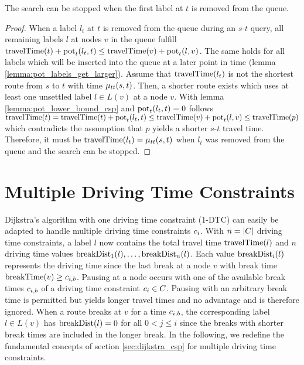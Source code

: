 \begin{theorem}\label{theorem:pot_stop_criterion}
	The search can be stopped when the first label at $t$ is removed from the queue.
\end{theorem}

\begin{proof}
	When a label $l_t$ at $t$ is removed from the queue during an $s$-$t$ query, all remaining labels $l$ at nodes $v$ in the queue fulfill $\operatorname{travelTime}(t) + \operatorname{pot}_t(l_t,t) \le \operatorname{travelTime}(v) + \operatorname{pot}_t(l,v)$. The same holds for all labels which will be inserted into the queue at a later point in time (lemma \ref{lemma:pot_labels_get_larger}). Assume that $\operatorname{travelTime}(l_t)$ is not the shortest route from $s$ to $t$ with time $\mu_{tt}(s,t)$. Then, a shorter route exists which uses at least one unsettled label $l \in L(v)$ at a node $v$. With lemma \ref{lemma:pot_lower_bound_csp} and $\operatorname{pot}_t(l_t,t) = 0$ follows $\operatorname{travelTime}(t) = \operatorname{travelTime}(t) + \operatorname{pot}_t(l_t,t) \le \operatorname{travelTime}(v) + \operatorname{pot}_t(l,v) \le \operatorname{travelTime}(p)$ which contradicts the assumption that $p$ yields a shorter $s$-$t$ travel time. Therefore, it must be $\operatorname{travelTime}(l_t) = \mu_{tt}(s,t)$ when $l_t$ was removed from the queue and the search can be stopped.
\end{proof}

\section{Multiple Driving Time Constraints}
Dijkstra's algorithm with one driving time constraint (1-DTC) can easily be adapted to handle multiple driving time constraints $c_i$. With $n=|C|$ driving time constraints, a label $l$ now contains the total travel time $\operatorname{travelTime}(l)$ and $n$ driving time values $\operatorname{breakDist}_1(l), \ldots , \operatorname{breakDist}_n(l)$. Each value $\operatorname{breakDist}_i(l)$ represents the driving time since the last break at a node $v$ with break time $\operatorname{breakTime}(v) \ge c_{i,b}$. Pausing at a node occurs with one of the available break times $c_{i,b}$ of a driving time constraint $c_i \in C$. Pausing with an arbitrary break time is permitted but yields longer travel times and no advantage and is therefore ignored. When a route breaks at $v$ for a time $c_{i,b}$, the corresponding label $l \in L(v)$ has $\operatorname{breakDist}(l) = 0$ for all $0 < j \le i$ since the breaks with shorter break times are included in the longer break. In the following, we redefine the fundamental concepts of section \ref{sec:dijkstra_csp} for multiple driving time constraints.

